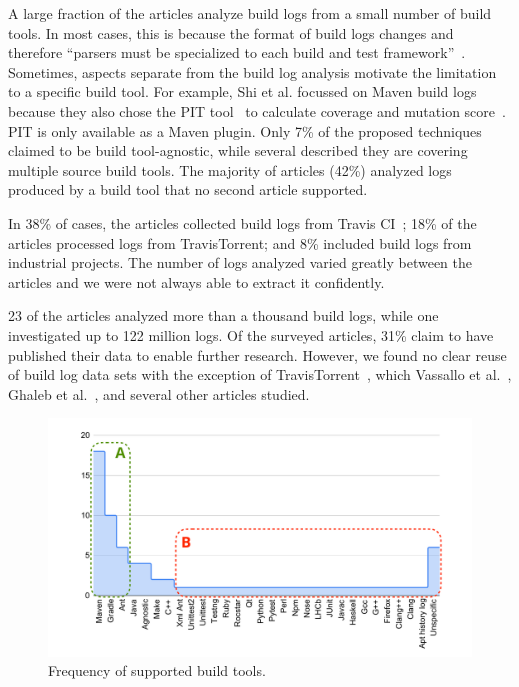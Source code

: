 A large fraction of the articles analyze build logs
from a small number of build tools.
In most cases, this is because the format of build logs
changes and
therefore ``parsers must be specialized to each build and test
framework''~\cite{tomassi2019bugswarm}.
Sometimes, aspects separate from the build log analysis motivate
the limitation to a specific build tool.
For example, Shi et al.
focussed on Maven
build logs because they also chose the PIT tool~\cite{coles2016pit}
to calculate coverage
and mutation score~\cite{shi2018evaluating}.
PIT is only available as a Maven plugin.
Only 7\% of the proposed techniques claimed to be
build tool-agnostic, while
several described they are covering multiple source build tools.
The majority of articles (42\%) analyzed logs produced by a build tool
that no second article supported.

In 38\% of cases, the articles collected build logs from Travis
CI~\cite{travisci2019webpage};
18\% of the articles processed logs from TravisTorrent; and 8\% included
build logs from industrial projects.
The number of logs analyzed varied greatly between the articles
and we were not always able to
extract it confidently.

23 of the articles analyzed more than a thousand build logs, while one
investigated up to 122 million logs.
Of the surveyed articles, 31\% claim to have published their data to
enable further research.
However, we found no clear reuse of build log data sets with the
exception of TravisTorrent~\cite{beller2017travistorrent}, which
Vassallo et al.~\cite{vassallo2017a-tale},
Ghaleb et al.~\cite{ghaleb2019studying},
and several other articles studied.

\begin{figure}[tbhp]
		\centering
		\includegraphics[width=\columnwidth, trim={1.5cm 0.4cm
		1.5cm 0.5cm},
		clip]{img/lit-sur/log_producer_annotated.pdf}
		\caption{Frequency of supported build tools.}
		\label{fig:litsur:log_producer}
\end{figure}

